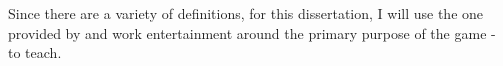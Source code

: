 \documentclass[a4paper,11.5pt]{report}
\numberwithin{figure}{section}
\numberwithin{table}{section}
\numberwithin{equation}{section}
\numberwithin{equation}{section}
\begin{document}
Since there are a variety of definitions, for this dissertation, I will use the one provided by \citeauthor{abt1970} and work entertainment around the primary purpose of the game - to teach.











\end{document}
